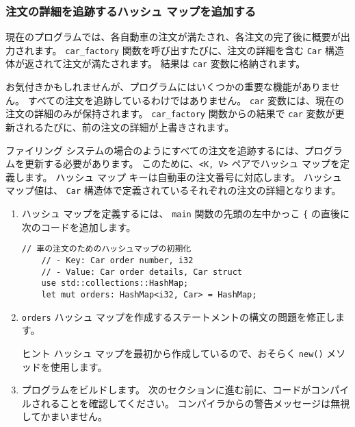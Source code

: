 \subsubsection{注文の詳細を追跡するハッシュ マップを追加する}

現在のプログラムでは、各自動車の注文が満たされ、各注文の完了後に概要が出力されます。 \texttt{car\_factory} 関数を呼び出すたびに、注文の詳細を含む \texttt{Car} 構造体が返されて注文が満たされます。 結果は \texttt{car} 変数に格納されます。

お気付きかもしれませんが、プログラムにはいくつかの重要な機能がありません。 すべての注文を追跡しているわけではありません。 \texttt{car} 変数には、現在の注文の詳細のみが保持されます。 \texttt{car\_factory} 関数からの結果で \texttt{car} 変数が更新されるたびに、前の注文の詳細が上書きされます。

ファイリング システムの場合のようにすべての注文を追跡するには、プログラムを更新する必要があります。 このために、\texttt{<K, V>} ペアでハッシュ マップを定義します。 ハッシュ マップ キーは自動車の注文番号に対応します。 ハッシュ マップ値は、 \texttt{Car} 構造体で定義されているそれぞれの注文の詳細となります。

\begin{enumerate}
\item ハッシュ マップを定義するには、 \texttt{main} 関数の先頭の左中かっこ \texttt{\{} の直後に次のコードを追加します。


\begin{lstlisting}[numbers=none]
    // 車の注文のためのハッシュマップの初期化
    // - Key: Car order number, i32
    // - Value: Car order details, Car struct
    use std::collections::HashMap;
    let mut orders: HashMap<i32, Car> = HashMap;
\end{lstlisting}

\item \texttt{orders} ハッシュ マップを作成するステートメントの構文の問題を修正します。

\begin{itembox}[l]{ヒント}
ハッシュ マップを最初から作成しているので、おそらく \texttt{new()} メソッドを使用します。
\end{itembox}

\item プログラムをビルドします。 次のセクションに進む前に、コードがコンパイルされることを確認してください。 コンパイラからの警告メッセージは無視してかまいません。

\end{enumerate}

